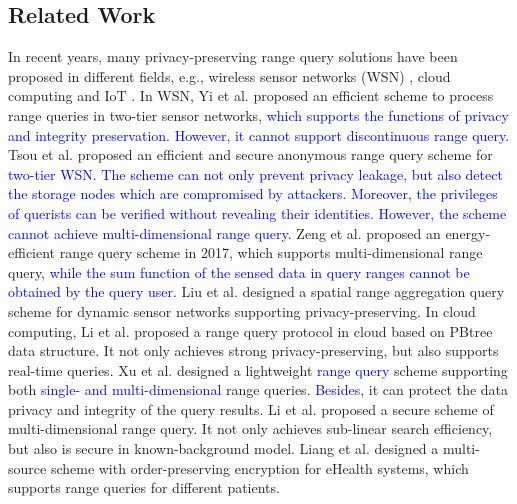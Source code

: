 \documentclass[IEEE JOURNAL OF BIOMEDICAL AND HEALTH INFORMATICS]{IEEEtran}
\begin{document}
\subsection{Related Work}
  In recent years, many privacy-preserving range query solutions have been proposed in different fields, e.g., wireless sensor networks (WSN) \cite{yi2013a,2017SER,zeng2017tieredWSN,2019Energy}, cloud computing \cite{li2016cloudcomputing,2019A, 2019Efficient, 2020Privacy} %
  and IoT \cite{Li2019,2019Effective,1111,mahdikhani2020IoT,hasan2020IoT,mahdikhani2020using}. In WSN, Yi et al. \cite{yi2013a} proposed an efficient scheme to process range queries in two-tier sensor networks, \textcolor{blue}{which supports the functions of privacy and integrity preservation.  However, it cannot support discontinuous range query.}
   Tsou et al. \cite{2017SER} proposed an efficient and secure anonymous range query scheme for \textcolor{blue}{two-tier WSN. The scheme can not only prevent privacy leakage, but also detect the storage nodes which are compromised by attackers. Moreover, the privileges of querists can be verified without revealing their identities. However, the scheme cannot achieve multi-dimensional range query.} Zeng et al. \cite{zeng2017tieredWSN} proposed an energy-efficient range query scheme in 2017, which supports multi-dimensional range query, \textcolor{blue}{while the sum function of the sensed data in query ranges cannot be obtained by the query user.} Liu et al. \cite{2019Energy} designed a spatial range aggregation query scheme for dynamic sensor networks supporting privacy-preserving. In cloud computing, Li et al. \cite{li2016cloudcomputing} proposed a range query protocol in cloud based on PBtree data structure. It not only achieves strong privacy-preserving, but also supports real-time queries. Xu et al. \cite{2019A} designed a lightweight \textcolor{blue}{range query} scheme supporting both \textcolor{blue}{single- and multi-dimensional} range queries. \textcolor{blue}{Besides}, it can protect the data privacy and  integrity of the query results. Li et al. \cite{2019Efficient} proposed a secure scheme of multi-dimensional range query. It not only achieves sub-linear search efficiency, but also is secure in known-background model. Liang et al. \cite{2020Privacy} designed a multi-source scheme with order-preserving encryption for eHealth systems, which supports range queries for different patients. 
\end{document}
